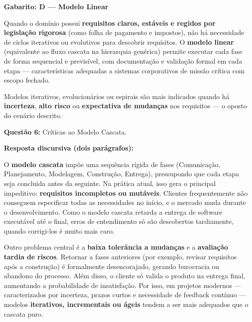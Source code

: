 \documentclass[12pt,a4paper]{article}
\begin{document}
\begin{tcolorbox}[respostabox]
\textbf{Gabarito: D --- Modelo Linear}

Quando o domínio possui \textbf{requisitos claros, estáveis e regidos por legislação rigorosa} (como folha de pagamento e impostos), não há necessidade de ciclos iterativos ou evolutivos para descobrir requisitos. O \textbf{modelo linear} (equivalente ao fluxo cascata na hierarquia genérica) permite executar cada fase de forma sequencial e previsível, com documentação e validação formal em cada etapa --- características adequadas a sistemas corporativos de missão crítica com escopo fechado.

Modelos iterativos, evolucionários ou espirais são mais indicados quando há \textbf{incerteza}, \textbf{alto risco} ou \textbf{expectativa de mudanças} nos requisitos --- o oposto do cenário descrito.
\end{tcolorbox}

\vspace{0.6cm}

\textbf{Questão 6:} Críticas ao Modelo Cascata.

\begin{tcolorbox}[respostabox]
\textbf{Resposta discursiva (dois parágrafos):}

O \textbf{modelo cascata} impõe uma sequência rígida de fases (Comunicação, Planejamento, Modelagem, Construção, Entrega), pressupondo que cada etapa seja concluída antes da seguinte. Na prática atual, isso gera o principal impeditivo: \textbf{requisitos incompletos ou mutáveis}. Clientes frequentemente não conseguem especificar todas as necessidades no início, e o mercado muda durante o desenvolvimento. Como o modelo cascata retarda a entrega de software executável até o final, erros de entendimento só são descobertos tardiamente, quando corrigi-los é muito mais caro.

Outro problema central é a \textbf{baixa tolerância a mudanças} e a \textbf{avaliação tardia de riscos}. Retornar a fases anteriores (por exemplo, revisar requisitos após a construção) é formalmente desencorajado, gerando burocracia ou abandono do processo. Além disso, o cliente só valida o produto na entrega final, aumentando a probabilidade de insatisfação. Por isso, em projetos modernos --- caracterizados por incerteza, prazos curtos e necessidade de feedback contínuo --- modelos \textbf{iterativos, incrementais ou ágeis} tendem a ser mais adequados que o cascata puro.
\end{tcolorbox}
\end{document}
